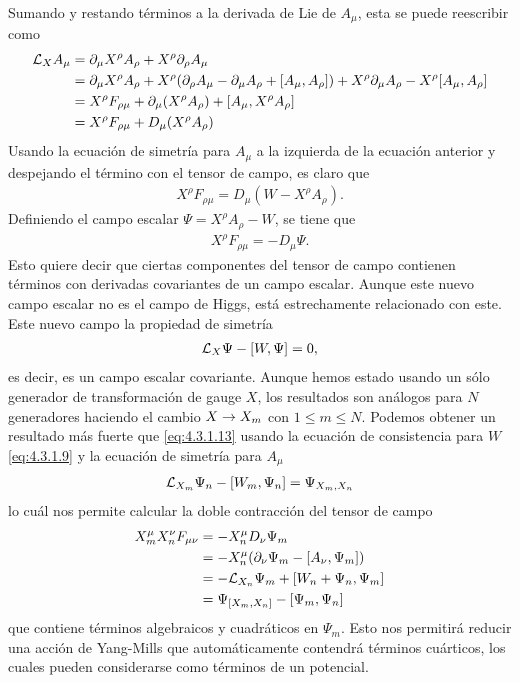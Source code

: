 Sumando y restando términos a la derivada de Lie de $A_\mu$, esta se puede reescribir como
\begin{align}\nonumber
	\mathcal{L}_X A_\mu &= \partial_\mu X^\rho A_\rho+X^\rho\partial_\rho A_\mu\\ \nonumber
	&= \partial_\mu X^\rho A_\rho+X^\rho(\partial_\rho A_\mu-\partial_\mu A_\rho+[A_\mu,A_\rho])+X^\rho\partial_\mu A_\rho-X^\rho[A_\mu,A_\rho]\\ \nonumber
	&=X^\rho F_{\rho\mu}+\partial_\mu(X^\rho A_\rho)+[A_\mu,X^\rho A_\rho]\\
	&= X^\rho F_{\rho\mu}+D_\mu(X^\rho A_\rho) \label{eq:4.3.1.10}
\end{align}
Usando la ecuación de simetría para $A_\mu$ a la izquierda de la ecuación anterior y despejando el término con el tensor de campo, es claro que
\begin{align}
	X^\rho F_{\rho\mu} = D_\mu(W-X^\rho A_\rho). \label{eq:4.3.1.11}
\end{align}
Definiendo el campo escalar $\Psi = X^\rho A_\rho-W$, se tiene que
\begin{align}
	X^\rho F_{\rho\mu} = -D_\mu\Psi. \label{eq:4.3.1.12}
\end{align}
Esto quiere decir que ciertas componentes del tensor de campo contienen términos con derivadas covariantes de un campo escalar. Aunque este nuevo campo escalar no es el campo de Higgs, está estrechamente relacionado con este. Este nuevo campo la propiedad de simetría
\begin{align}
	\mathcal{L}_X\Psi-[W,\Psi] =0, \label{eq:4.3.1.13}
\end{align}
es decir, es un campo escalar covariante. Aunque hemos estado usando un sólo generador de transformación de gauge $X$, los resultados son análogos para $N$ generadores haciendo el cambio $X\rightarrow X_m$ con $1\leq m\leq N$. Podemos obtener un resultado más fuerte que \eqref{eq:4.3.1.13} usando la ecuación de consistencia para $W$ \eqref{eq:4.3.1.9} y la ecuación de simetría para $A_\mu$
\begin{align}
	\mathcal{L}_{X_m}\Psi_n-[W_m,\Psi_n] = \Psi_{X_m,X_n} \label{eq:4.3.1.14}
\end{align}
lo cuál nos permite calcular la doble contracción del tensor de campo
\begin{align}\nonumber
	X^\mu_m X^\nu_n F_{\mu\nu} &= -X^\mu_n D_\nu\Psi_m\\ \nonumber
	&= -X^\mu_n(\partial_\nu\Psi_m-[A_\nu,\Psi_m])\\ \nonumber
	&= -\mathcal{L}_{X_n}\Psi_m+[W_n+\Psi_n,\Psi_m]\\
	&=\Psi_{[X_m,X_n]}-[\Psi_m,\Psi_n] \label{eq:4.3.1.15}
\end{align}
que contiene términos algebraicos y cuadráticos en $\Psi_m$. Esto nos permitirá reducir una acción de Yang-Mills que automáticamente contendrá términos cuárticos, los cuales pueden considerarse como términos de un potencial.

